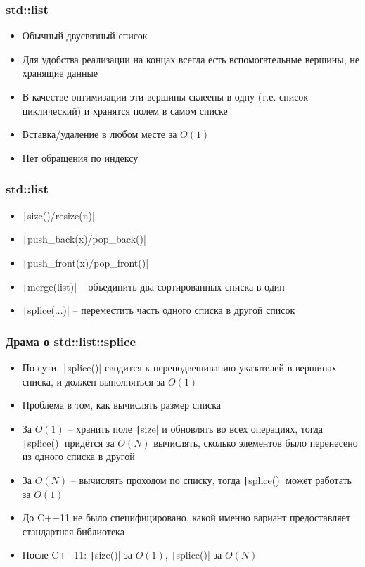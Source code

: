 \documentclass[10pt]{beamer}
\begin{document}
\begin{frame}[fragile]
\frametitle{std::list}
\begin{itemize}
\item Обычный двусвязный список
\pause
\item Для удобства реализации на концах всегда есть вспомогательные вершины, не хранящие данные
\pause
\item В качестве оптимизации эти вершины склеены в одну (т.е. список циклический) и хранятся полем в самом списке
\pause
\item Вставка/удаление в любом месте за \(O(1)\)
\pause
\item Нет обращения по индексу
\end{itemize}
\end{frame}

\begin{frame}[fragile]
\frametitle{std::list}
\begin{itemize}
\item \texttt|size()/resize(n)|
\pause
\item \texttt|push_back(x)/pop_back()|
\pause
\item \texttt|push_front(x)/pop_front()|
\pause
\item \texttt|merge(list)| -- объединить два сортированных списка в один
\pause
\item \texttt|splice(...)| -- переместить часть одного списка в другой список
\end{itemize}
\end{frame}

\begin{frame}[fragile]
\frametitle{Драма о std::list::splice}
\begin{itemize}
\item По сути, \texttt|splice()| сводится к переподвешиванию указателей в вершинах списка, и должен выполняться за \(O(1)\)
\pause
\item Проблема в том, как вычислять размер списка
\pause
\item За \(O(1)\) -- хранить поле \texttt|size| и обновлять во всех операциях, тогда \texttt|splice()| придётся за \(O(N)\) вычислять, сколько элементов было перенесено из одного списка в другой
\pause
\item За \(O(N)\) -- вычислять проходом по списку, тогда \texttt|splice()| может работать за \(O(1)\)
\pause
\item До C++11 не было специфицировано, какой именно вариант предоставляет стандартная библиотека
\pause
\item После C++11: \texttt|size()| за \(O(1)\), \texttt|splice()| за \(O(N)\)
\end{itemize}
\end{frame}
\end{document}
